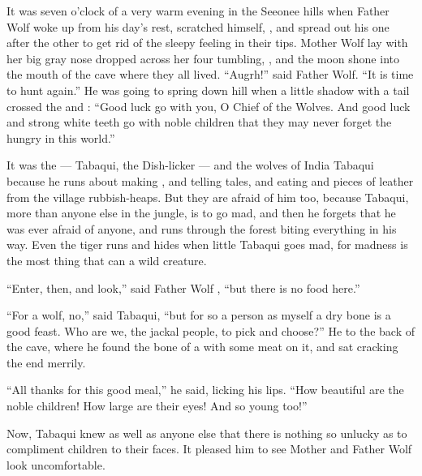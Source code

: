 \documentclass[troisieme]{fiche}
\begin{document}
\begin{texte}
It was seven o'clock of a very warm evening in the Seeonee hills when Father Wolf woke up from
his day's rest, scratched himself, , and spread out his
 one after the other to get rid of the sleepy feeling in their
tips. Mother Wolf lay with her big gray nose dropped across her four tumbling,
 , and the moon shone
into the mouth of the cave where they all lived. ``Augrh!'' said Father Wolf. ``It is time to
hunt again.'' He was going to spring down hill when a little shadow with a
 tail crossed the  and
: ``Good luck go with you, O Chief of the Wolves. And good luck
and strong white teeth go with noble children that they may never forget the hungry in this
world.''

It was the  --- Tabaqui, the Dish-licker --- and the wolves of
India  Tabaqui because he runs about making
, and telling tales, and eating
 and pieces of leather from the village rubbish-heaps. But they
are afraid of him too, because Tabaqui, more than anyone else in the jungle, is
 to go mad, and then he forgets that he was ever
afraid of anyone, and runs through the forest biting everything in his way. Even the tiger
runs and hides when little Tabaqui goes mad, for madness is the most
 thing that can  a wild creature.

``Enter, then, and look,'' said Father Wolf , ``but there
is no food here.''

``For a wolf, no,'' said Tabaqui, ``but for so  a person as
myself a dry bone is a good feast. Who are we, the jackal people, to pick and choose?'' He
 to the back of the cave, where he found the bone of a
 with some meat on it, and sat cracking the end merrily.

``All thanks for this good meal,'' he said, licking his lips. ``How beautiful are the noble
children! How large are their eyes! And so young too!''

Now, Tabaqui knew as well as anyone else that there is nothing so unlucky as to compliment
children to their faces. It pleased him to see Mother and Father Wolf look uncomfortable.
\end{texte}
\end{document}
